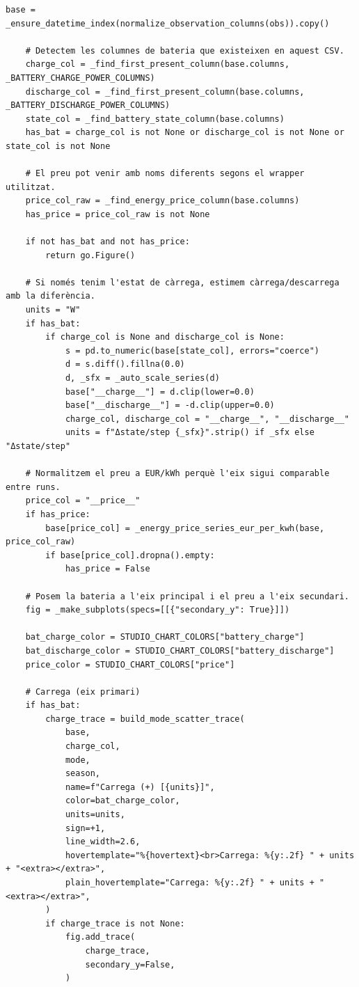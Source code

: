 \documentclass[10pt,a4paper]{article}
\begin{document}
\begin{lstlisting}[style=studioPython,caption={backend/grafics/battery.py},label={lst:backend-grafics-battery-py}]
    base = _ensure_datetime_index(normalize_observation_columns(obs)).copy()

    # Detectem les columnes de bateria que existeixen en aquest CSV.
    charge_col = _find_first_present_column(base.columns, _BATTERY_CHARGE_POWER_COLUMNS)
    discharge_col = _find_first_present_column(base.columns, _BATTERY_DISCHARGE_POWER_COLUMNS)
    state_col = _find_battery_state_column(base.columns)
    has_bat = charge_col is not None or discharge_col is not None or state_col is not None

    # El preu pot venir amb noms diferents segons el wrapper utilitzat.
    price_col_raw = _find_energy_price_column(base.columns)
    has_price = price_col_raw is not None

    if not has_bat and not has_price:
        return go.Figure()

    # Si només tenim l'estat de càrrega, estimem càrrega/descarrega amb la diferència.
    units = "W"
    if has_bat:
        if charge_col is None and discharge_col is None:
            s = pd.to_numeric(base[state_col], errors="coerce")
            d = s.diff().fillna(0.0)
            d, _sfx = _auto_scale_series(d)
            base["__charge__"] = d.clip(lower=0.0)
            base["__discharge__"] = -d.clip(upper=0.0)
            charge_col, discharge_col = "__charge__", "__discharge__"
            units = f"Δstate/step {_sfx}".strip() if _sfx else "Δstate/step"

    # Normalitzem el preu a EUR/kWh perquè l'eix sigui comparable entre runs.
    price_col = "__price__"
    if has_price:
        base[price_col] = _energy_price_series_eur_per_kwh(base, price_col_raw)
        if base[price_col].dropna().empty:
            has_price = False

    # Posem la bateria a l'eix principal i el preu a l'eix secundari.
    fig = _make_subplots(specs=[[{"secondary_y": True}]])

    bat_charge_color = STUDIO_CHART_COLORS["battery_charge"]
    bat_discharge_color = STUDIO_CHART_COLORS["battery_discharge"]
    price_color = STUDIO_CHART_COLORS["price"]

    # Carrega (eix primari)
    if has_bat:
        charge_trace = build_mode_scatter_trace(
            base,
            charge_col,
            mode,
            season,
            name=f"Carrega (+) [{units}]",
            color=bat_charge_color,
            units=units,
            sign=+1,
            line_width=2.6,
            hovertemplate="%{hovertext}<br>Carrega: %{y:.2f} " + units + "<extra></extra>",
            plain_hovertemplate="Carrega: %{y:.2f} " + units + "<extra></extra>",
        )
        if charge_trace is not None:
            fig.add_trace(
                charge_trace,
                secondary_y=False,
            )


\end{lstlisting}
\end{document}

